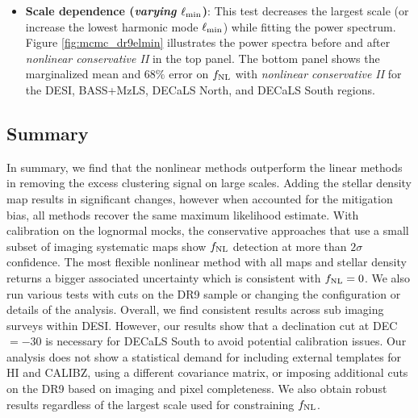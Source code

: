 \begin{itemize}[itemindent=*]
\item \textbf{Scale dependence (\textit{varying $\ell_{\rm min}$})}: This test decreases the largest scale (or increase the lowest harmonic mode $\ell_{\rm min}$) while fitting the power spectrum. Figure \ref{fig:mcmc_dr9elmin} illustrates the power spectra before and after \textit{nonlinear conservative II} in the top panel. The bottom panel shows the marginalized mean and $68\%$ error on $f_{\rm NL}$ with \textit{nonlinear conservative II} for the DESI, BASS+MzLS, DECaLS North, and DECaLS South regions. 

\end{itemize}

\subsection{Summary}
In summary, we find that the nonlinear methods outperform the linear methods in removing the excess clustering signal on large scales. Adding the stellar density map results in significant changes, however when accounted for the mitigation bias, all methods recover the same maximum likelihood estimate. With calibration on the lognormal mocks, the conservative approaches that use a small subset of imaging systematic maps show $f_{\rm NL}$ detection at more than $2\sigma$ confidence. The most flexible nonlinear method with all maps and stellar density returns a bigger associated uncertainty which is consistent with $f_{\rm NL}=0$. We also run various tests with cuts on the DR9 sample or changing the configuration or details of the analysis. Overall, we find consistent results across sub imaging surveys within DESI. However, our results show that a declination cut at DEC $=-30$ is necessary for DECaLS South to avoid potential calibration issues. Our analysis does not show a statistical demand for including external templates for HI and CALIBZ, using a different covariance matrix, or imposing additional cuts on the DR9 based on imaging and pixel completeness. We also obtain robust results regardless of the largest scale used for constraining $f_{\rm NL}$.